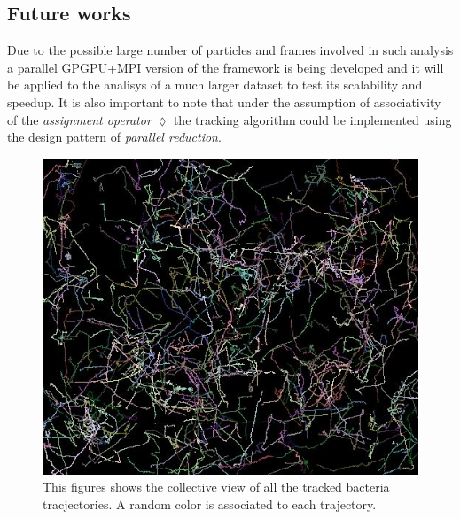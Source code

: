 \documentclass[conference]{IEEEtran}
\begin{document}
\subsection{Future works}
Due to the possible large number of particles and frames involved in such analysis a parallel GPGPU+MPI version of the framework is being developed and it will be applied to the analisys of a much larger dataset to test its scalability and speedup.
It is also important to note that under the assumption of associativity of the \textit{assignment operator} $\lozenge$ the tracking algorithm could be implemented using the design pattern of \textit{parallel reduction}.

    \begin{figure}[h]
      \begin{center}
        \includegraphics[scale=0.5]{./images/result.png}
        \caption{This figures shows the collective view of all the tracked bacteria tracjectories. A random color is associated to each trajectory.}\label{fig:}
        
      \end{center}
    \end{figure}


\end{document}
